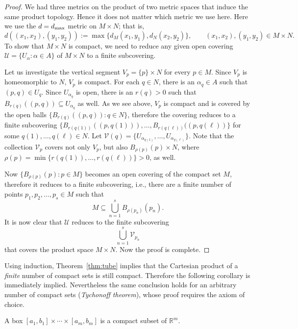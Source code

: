 \begin{proof}
  We had three metrics on the product of two metric spaces that induce the same product topology.
  Hence it does not matter which metric we use here.
  Here we use the $d = d_{\operatorname{max}}$ metric on $M \times N$; that is,
  \[
    d( (x_1, x_2), (y_1, y_2) ) := \max \{ d_M(x_1, y_1), d_N(x_2, y_2) \}, \qquad (x_1,x_2), (y_1, y_2) \in M \times N.
  \]
  To show that $M \times N$ is compact, we need to reduce any given open covering $\mathcal{U} = \{ U_\alpha \colon \alpha \in A \}$ of $M \times N$ to a finite subcovering.

  Let us investigate the vertical segment $V_p = \{ p \} \times N$ for every $p \in M$.
  Since $V_p$ is homeomorphic to $N$, $V_p$ is compact.
  For each $q \in N$, there is an $\alpha_q \in A$ such that $(p,q) \in U_q$.
  Since $U_{\alpha_q}$ is open, there is an $r(q) > 0$ such that $B_{r(q)}( (p,q) ) \subseteq U_{\alpha_q}$ as well.
  As we see above, $V_p$ is compact and is covered by the open balls $\{ B_{r(q)}( (p,q) ) \colon q \in N \}$, therefore the covering reduces to a finite subcovering $\{ B_{r(q(1))}( (p,q(1)) ), \dots, B_{r(q(\ell))}( (p,q(\ell) )\}$ for some $q(1), \dots, q(\ell) \in N$.
  Let $\mathcal{V}(q) = \{ U_{\alpha_{q(1)}}, \dots, U_{\alpha_{q(\ell)}} \}$. 
  Note that the collection $\mathcal{V}_p$ covers not only $V_p$, but also $B_{\rho(p)}(p) \times N$, where $\rho(p) = \min \{ r(q(1)), \dots, r(q(\ell)) \} > 0$, as well. 

  Now $\{ B_{\rho(p)}(p) \colon p \in M \}$ becomes an open covering of the compact set $M$, therefore it reduces to a finite subcovering, i.e., there are a finite number of points $p_1, p_2, \dots, p_s \in M$ such that
  \[
    M \subseteq \bigcup_{n=1}^s B_{\rho(p_n)}(p_n).
  \]
  It is now clear that $\mathcal{U}$ reduces to the finite subcovering
  \[
    \bigcup_{n=1}^s \mathcal{V}_{p_n}
  \]
  that covers the product space $M \times N$.
  Now the proof is complete.
\end{proof}

Using induction, Theorem~\ref{thm:tube} implies that the Cartesian product of a \textit{finite} number of compact sets is still compact.
Therefore the following corollary is immediately implied.
Nevertheless the same conclusion holds for an arbitrary number of compact sets (\textit{Tychonoff theorem}), whose proof requires the axiom of choice.

\begin{cor}
  A box $[a_1, b_1] \times \cdots \times [a_m, b_m]$ is a compact subset of $\mathbb{R}^m$.
\end{cor}

